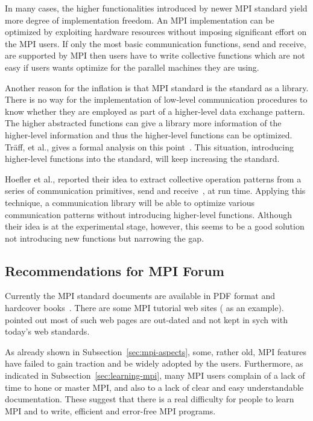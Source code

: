 \documentclass[preprint,5p,times]{elsarticle}
\newcommand{\revision}[2]{{\color{blue}#2}}
\begin{document}
{In many cases, the higher functionalities introduced by newer MPI standard yield
more degree of implementation freedom. An MPI implementation can be optimized by
exploiting hardware resources without imposing significant effort on the MPI
users. If only the most basic communication functions, send and receive, are
supported by MPI then users have to write collective functions which are not
easy if users wants optimize for the parallel machines they are using.

Another reason \revision{of}{for} the inflation is that MPI standard is the standard
as a library. There is no way for \revision{library functions to know how the
library functions are called in which context}{the implementation of low-level communication procedures
to know whether they are employed as part of a higher-level data exchange
pattern}. The higher abstracted
functions can give a library more information of \revision{how and
  which}{the higher-level information} and
thus the higher-level functions can be optimized. Tr\"{a}ff, et al., gives
a formal analysis on this point~\cite{5184825}.
This situation, introducing higher-level functions into the standard,
will keep increasing the standard.

Hoefler et al., reported their idea to extract collective operation
patterns from a series of communication primitives, send and
receive~\cite{7842939}, at run time. Applying this technique, a
communication library will be able to optimize various communication
patterns without introducing higher-level functions.
Although their idea is at the experimental
stage, however, this seems to be a good solution not introducing new
functions but narrowing the gap.

\subsection{Recommendations for MPI Forum}

Currently the MPI standard documents are available in PDF format and
hardcover books~\cite{mpi-hardcover}. There are some MPI tutorial web
sites (\cite{mpi-tutorial} as an example). \cite{mpi-tutorial-intro}
pointed out most of such web pages are out-dated and not
kept in sych with today's web standards.

As already shown in Subsection~\ref{sec:mpi-aspects}, some, rather old, MPI
features have failed to gain traction and be widely \revision{accepted}{adopted} by the users.
Furthermore, as indicated in Subsection~\ref{sec:learning-mpi}, many MPI users
complain of a lack of time to hone or master MPI, and also to a lack of clear
and easy understandable documentation. These suggest that there is a real
difficulty for people to learn MPI and to write, efficient and error-free MPI programs.

}
\end{document}
